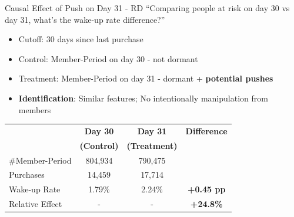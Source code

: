 \documentclass[aspectratio=169]{beamer}  %
\begin{document}
\begin{frame}{Causal Effect of Push on Day 31 - RD}
``Comparing people at risk on day 30 vs day 31, what's the wake-up rate difference?''

\begin{itemize}
    \item Cutoff: 30 days since last purchase
    \item Control: Member-Period on day 30 - not dormant
    \item Treatment: Member-Period on day 31 - dormant + \textbf{potential pushes}
    \item \textbf{Identification}: Similar features; No intentionally manipulation from members
\end{itemize}
\begin{table}[h]
\centering
\footnotesize
\begin{tabular}{lccc}
& \textbf{Day 30} & \textbf{Day 31} & \textbf{Difference} \\
& \textbf{(Control)} & \textbf{(Treatment)} & \\
\hline
\#Member-Period & 804,934 & 790,475 & \\
Purchases & 14,459 & 17,714 & \\
Wake-up Rate & 1.79\% & 2.24\% & \textbf{+0.45 pp} \\
Relative Effect & - & - & \textbf{+24.8\%} \\
\end{tabular}
\end{table}    
\end{frame}
\end{document}
